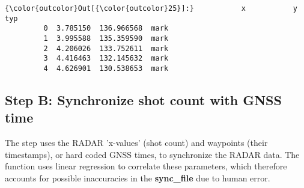\documentclass[11pt]{article}
\begin{document}
\begin{Verbatim}[commandchars=\\\{\}]
{\color{outcolor}Out[{\color{outcolor}25}]:}           x           y   typ
         0  3.785150  136.966568  mark
         1  3.995588  135.359590  mark
         2  4.206026  133.752611  mark
         3  4.416463  132.145632  mark
         4  4.626901  130.538653  mark
\end{Verbatim}
            
    \subsection{Step B: Synchronize shot count with GNSS
time}\label{step-b-synchronize-shot-count-with-gnss-time}

The step uses the RADAR 'x-values' (shot count) and waypoints (their
timestamps), or hard coded GNSS times, to synchronize the RADAR data.
The function uses linear regression to correlate these parameters, which
therefore accounts for possible inaccuracies in the \textbf{sync\_file}
due to human error.
\end{document}
